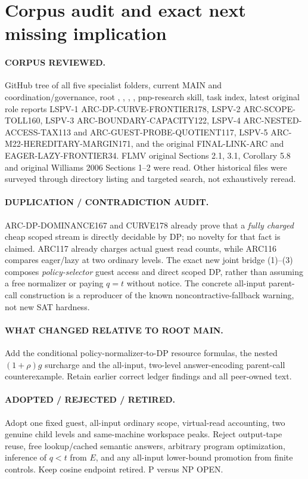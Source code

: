\documentclass[11pt]{article}
\begin{document}
\section{Corpus audit and exact next missing implication}
\paragraph{CORPUS REVIEWED.}
GitHub tree of all five specialist folders, current MAIN and
coordination/governance, root ,
, , ,
pnp-research skill, task index, latest original role reports
LSPV-1 ARC-DP-CURVE-FRONTIER178,
LSPV-2 ARC-SCOPE-TOLL160,
LSPV-3 ARC-BOUNDARY-CAPACITY122,
LSPV-4 ARC-NESTED-ACCESS-TAX113 and
ARC-GUEST-PROBE-QUOTIENT117, LSPV-5
ARC-M22-HEREDITARY-MARGIN171, and the original
FINAL-LINK-ARC and EAGER-LAZY-FRONTIER34.
FLMV original Sections 2.1, 3.1, Corollary 5.8 and
original Williams 2006 Sections 1--2 were read.
Other historical files were surveyed through directory
listing and targeted search, not exhaustively reread.

\paragraph{DUPLICATION / CONTRADICTION AUDIT.}
ARC-DP-DOMINANCE167 and CURVE178 already prove that a
\emph{fully charged} cheap scoped stream is directly
decidable by DP; no novelty for that fact is claimed.
ARC117 already charges actual guest read counts, while
ARC116 compares eager/lazy at two ordinary levels.
The exact new joint bridge (1)--(3) composes
\emph{policy-selector} guest access and direct scoped DP,
rather than assuming a free normalizer or paying
$q=t$ without notice. The concrete all-input
parent-call construction is a reproducer of the known
noncontractive-fallback warning, not new SAT hardness.

\paragraph{WHAT CHANGED RELATIVE TO ROOT MAIN.}
Add the conditional policy-normalizer-to-DP resource
formulas, the nested $(1+\rho)g$ surcharge and the
all-input, two-level answer-encoding parent-call
counterexample. Retain earlier correct ledger findings
and all peer-owned text.

\paragraph{ADOPTED / REJECTED / RETIRED.}
Adopt one fixed guest, all-input ordinary scope,
virtual-read accounting, two genuine child levels
and same-machine workspace peaks.
Reject output-tape reuse, free lookup/cached
semantic answers, arbitrary program optimization,
inference of $q<t$ from $E$, and any
all-input lower-bound promotion from finite controls.
Keep cosine endpoint retired. P versus NP OPEN.
\end{document}
